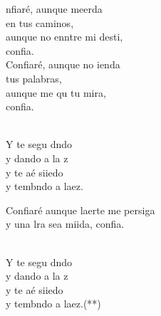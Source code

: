 \begin{cancion}[Confiaré][]%
	nfiaré, aunque meerda \\
	\jump
en tus caminos,\\
	aunque no enntre mi desti, \\
	confia. \\
	Confiaré, aunque no ienda \\
	\jump
tus palabras,\\
	aunque me qu tu mira, \\
	confia. \\
	\jumjump\\
	\begin{chorus}%
		Y te segu dndo  \\
		y dando a la z\\
		y te aé siiedo \\
		y tembndo a laez.\jump\\
	\end{chorus}%
	Confiaré aunque laerte me persiga\\
	y una lra sea miida, confia. \\
	\jumjump\\
	\begin{chorus}%
		Y te segu dndo  \\
		y dando a la \chord{Mi}{}{ve}z\\
		y te aé siiedo \\
		y tembndo a laez.(**)\jump\\
	\end{chorus}%
\end{cancion}%
